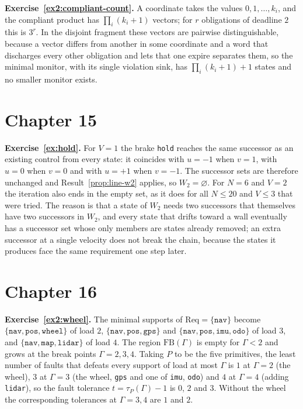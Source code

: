 \textbf{Exercise~\ref{ex2:compliant-count}.} A coordinate takes the values $0,1,\dots,k_i$, and the compliant product has $\prod_i(k_i+1)$ vectors; for $r$ obligations of deadline $2$ this is $3^{r}$. In the disjoint fragment these vectors are pairwise distinguishable, because a vector differs from another in some coordinate and a word that discharges every other obligation and lets that one expire separates them, so the minimal monitor, with its single violation sink, has $\prod_i(k_i+1)+1$ states and no smaller monitor exists.

\section*{Chapter 15}

\textbf{Exercise~\ref{ex:hold}.} For $V=1$ the brake \texttt{hold} reaches the same successor as an existing control from every state: it coincides with $u=-1$ when $v=1$, with $u=0$ when $v=0$ and with $u=+1$ when $v=-1$. The successor sets are therefore unchanged and Result~\ref{prop:line-w2} applies, so $W_2=\varnothing$. For $N=6$ and $V=2$ the iteration also ends in the empty set, as it does for all $N\le20$ and $V\le3$ that were tried. The reason is that a state of $W_2$ needs two successors that themselves have two successors in $W_2$, and every state that drifts toward a wall eventually has a successor set whose only members are states already removed; an extra successor at a single velocity does not break the chain, because the states it produces face the same requirement one step later.

\section*{Chapter 16}

\textbf{Exercise~\ref{ex2:wheel}.} The minimal supports of $\mathrm{Req}=\{\texttt{nav}\}$ become $\{\texttt{nav},\texttt{pos},\texttt{wheel}\}$ of load $2$, $\{\texttt{nav},\texttt{pos},\texttt{gps}\}$ and $\{\texttt{nav},\texttt{pos},\texttt{imu},\texttt{odo}\}$ of load $3$, and $\{\texttt{nav},\texttt{map},\texttt{lidar}\}$ of load $4$. The region $\mathrm{FB}(\Gamma)$ is empty for $\Gamma<2$ and grows at the break points $\Gamma=2,3,4$. Taking $P$ to be the five primitives, the least number of faults that defeats every support of load at most $\Gamma$ is $1$ at $\Gamma=2$ (the wheel), $3$ at $\Gamma=3$ (the wheel, \texttt{gps} and one of \texttt{imu}, \texttt{odo}) and $4$ at $\Gamma=4$ (adding \texttt{lidar}), so the fault tolerance $t=\tau_P(\Gamma)-1$ is $0$, $2$ and $3$. Without the wheel the corresponding tolerances at $\Gamma=3,4$ are $1$ and $2$.

